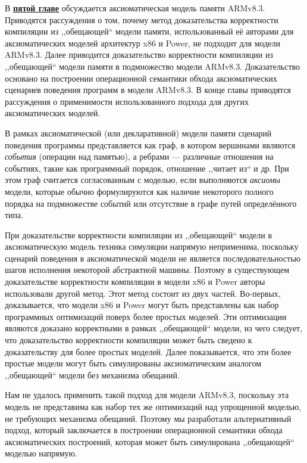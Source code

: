 В \underline{\textbf{пятой главе}} обсуждается аксиоматическая модель памяти ARMv8.3.
Приводятся рассуждения о том, почему метод доказательства корректности компиляции из
,,обещающей`` модели памяти, использованный её авторами для аксиоматических моделей архитектур x86 и Power,
не подходит для модели ARMv8.3. Далее приводится доказательство корректности компиляции из ,,обещающей`` модели
памяти в подмножество модели ARMv8.3. Доказательство основано на построении операционной семантики обхода аксиоматических сценариев
поведения программ в модели ARMv8.3. В конце главы приводятся рассуждения о применимости использованного подхода для других
аксиоматических моделей.

В рамках аксиоматической (или декларативной) модели памяти сценарий поведения программы представляется как граф, в котором вершинами
являются \emph{события} (операции над памятью), а ребрами --- различные отношения на событиях, такие как программный
порядок, отношение ,,читает из`` и др. При этом граф считается согласованным с моделью, если выполняются \emph{аксиомы} модели,
которые обычно формулируются как наличие некоторого полного порядка на подмножестве событий или отсутствие  в графе путей определённого
типа.

При доказательстве корректности компиляции из ,,обещающей`` модели в аксиоматическую модель техника симуляции напрямую
неприменима, поскольку сценарий поведения в аксиоматической модели не является последовательностью шагов исполнения некоторой абстрактной машины.
Поэтому в существующем доказательстве корректности компиляции в 
модели x86 и Power авторы использовали другой метод. Этот метод состоит из двух частей.
Во-первых, доказывается, что модели x86 и Power могут быть представлены как набор программных оптимизаций поверх
более простых моделей. Эти оптимизации являются доказано корректными в рамках ,,обещающей`` модели, из чего следует,
что доказательство корректности компиляции может быть сведено к доказательству для более простых моделей.
Далее показывается, что эти более простые модели могут быть симулированы аксиоматическим аналогом
,,обещающей`` модели без механизма обещаний.

Нам не удалось применить такой подход для модели ARMv8.3, поскольку эта модель не представима как набор тех же
оптимизаций над упрощенной моделью, не требующих механизма обещаний. Поэтому мы разработали альтернативный подход,
который заключается в построении операционной семантики обхода аксиоматических построений, которая может быть
симулирована ,,обещающей`` моделью напрямую.

